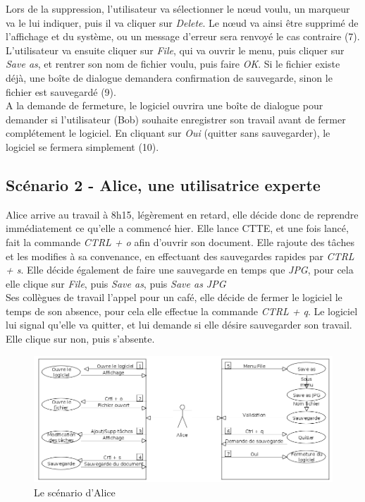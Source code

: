 \documentclass[12pt, a4paper]{article}
\begin{document}
Lors de la suppression, l'utilisateur va sélectionner le nœud voulu, un marqueur va le lui indiquer, puis il va cliquer sur \emph{Delete}. Le nœud va ainsi être supprimé de l'affichage et du système, ou un message d'erreur sera renvoyé le cas contraire (7).\\ 


L'utilisateur va ensuite cliquer sur \emph{File}, qui va ouvrir le menu, puis cliquer sur \emph{Save as}, et rentrer son nom de fichier voulu, puis faire \emph{OK}. Si le fichier existe déjà, une boîte de dialogue demandera confirmation de sauvegarde, sinon le fichier est sauvegardé (9).\\ 


A la demande de fermeture, le logiciel ouvrira une boîte de dialogue pour demander si l'utilisateur (Bob) souhaite enregistrer son travail avant de fermer complétement le logiciel. En cliquant sur \emph{Oui} (quitter sans sauvegarder), le logiciel se fermera simplement (10). \\ \newpage
\subsection{Scénario 2 - Alice, une utilisatrice experte}


Alice arrive au travail à 8h15, légèrement en retard, elle décide donc de reprendre immédiatement ce qu'elle a commencé hier. Elle lance CTTE, et une fois lancé, fait la commande \emph{CTRL + o} afin d'ouvrir son document. Elle rajoute des tâches et les modifies à sa convenance, en effectuant des sauvegardes rapides par \emph{CTRL + s}. Elle décide également de faire une sauvegarde en temps que \emph{JPG}, pour cela elle clique sur \emph{File}, puis \emph{Save as}, puis \emph{Save as JPG} \\


Ses collègues de travail l'appel pour un café, elle décide de fermer le logiciel le temps de son absence, pour cela elle effectue la commande \emph{CTRL + q}. Le logiciel lui signal qu'elle va quitter, et lui demande si elle désire sauvegarder son travail. Elle clique sur non, puis s'absente.\\

\begin{figure}[h]
\begin{center}
   \includegraphics[scale = 0.4]{scenario-alice.png}
	\caption{Le scénario d'Alice}
	\end{center}
\end{figure}
\end{document}
